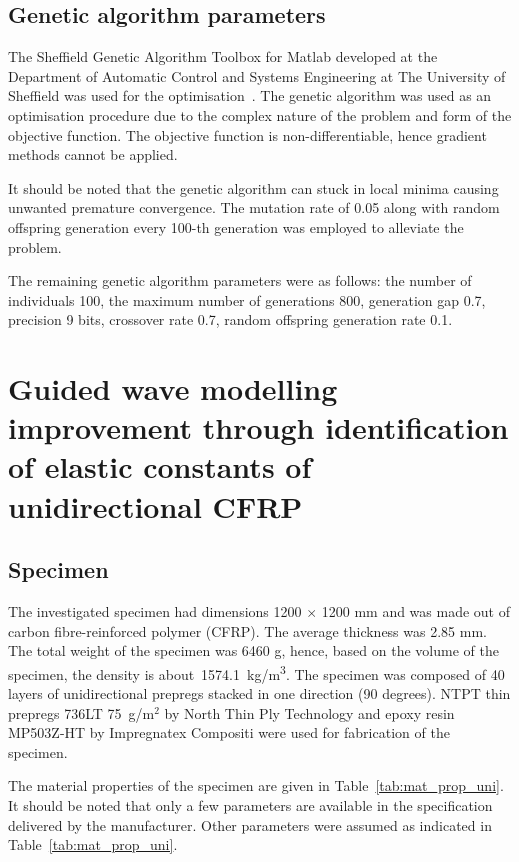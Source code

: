 \documentclass[preprint,12pt]{elsarticle}
\begin{document}
\subsection{Genetic algorithm parameters}
The Sheffield Genetic Algorithm Toolbox for Matlab developed at the Department of Automatic Control and Systems Engineering at The University of Sheffield was used for the optimisation~\cite{Chipperfield1994}.
The genetic algorithm was used as an optimisation procedure due to the complex nature of the problem and form of the objective function. 
The objective function is non-differentiable, hence gradient methods cannot be applied. 

It should be noted that the genetic algorithm can stuck in local minima causing unwanted premature convergence. 
The mutation rate of 0.05 along with random offspring generation every 100-th generation was employed to alleviate the problem.

The remaining genetic algorithm parameters were as follows: the number of individuals 100, the maximum number of generations 800, generation gap 0.7, precision 9 bits, crossover rate 0.7,  random offspring generation rate 0.1.
\section{Guided wave modelling improvement through identification of elastic constants of unidirectional CFRP \label{sec:modelling_improvement}} 
\subsection{Specimen}
The investigated specimen had dimensions 1200 $\times$ 1200 mm and was made out of carbon fibre-reinforced polymer (CFRP). 
The average thickness was 2.85 mm.
The total weight of the specimen was 6460 g, hence, based on the volume of the specimen, the density is about~1574.1~kg/m\textsuperscript{3}.
The specimen was composed of 40 layers of unidirectional prepregs stacked in one direction (90 degrees). 
NTPT thin prepregs 736LT 75~g/m$^2$ by North Thin Ply Technology and epoxy resin MP503Z-HT by Impregnatex Compositi were used for fabrication of the specimen.

The material properties of the specimen are given in Table~\ref{tab:mat_prop_uni}. 
It should be noted that only a few parameters are available in the specification delivered by the manufacturer. 
Other parameters were assumed as indicated in Table~\ref{tab:mat_prop_uni}.
\end{document}
